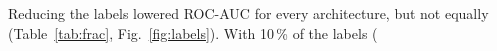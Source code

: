 Reducing the labels lowered ROC-AUC for every architecture, but not equally (Table~\ref{tab:frac}, Fig.~\ref{fig:labels}). With 10\,\% of the labels (%
